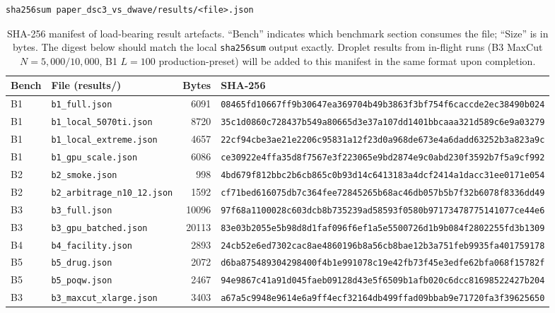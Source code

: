 \documentclass[11pt,a4paper]{article}
\begin{document}
\begin{verbatim}
sha256sum paper_dsc3_vs_dwave/results/<file>.json
\end{verbatim}

\begin{table}[h]
\centering
\caption{SHA-256 manifest of load-bearing result artefacts.
``Bench'' indicates which benchmark section consumes the file;
``Size'' is in bytes. The digest below should match the local
\texttt{sha256sum} output exactly. Droplet results from in-flight runs
(B3 MaxCut $N\!=\!5{,}000/10{,}000$, B1 $L\!=\!100$ production-preset)
will be added to this manifest in the same format upon completion.}
\label{tab:data_manifest}
\scriptsize
\setlength{\tabcolsep}{4pt}
\begin{tabular}{@{}l l r p{8.0cm}@{}}
\toprule
Bench & File (results/) & Bytes & SHA-256 \\
\midrule
B1 & \texttt{b1\_full.json}              & 6091  & \texttt{08465fd10667ff9b30647ea369704b49b3863f3bf754f6caccde2ec38490b024} \\
B1 & \texttt{b1\_local\_5070ti.json}     & 8720  & \texttt{35c1d0860c728437b549a80665d3e37a107dd1401bbcaaa321d589c6e9a03279} \\
B1 & \texttt{b1\_local\_extreme.json}    & 4657  & \texttt{22cf94cbe3ae21e2206c95831a12f23d0a968de673e4a6dadd63252b3a823a9c} \\
B1 & \texttt{b1\_gpu\_scale.json}        & 6086  & \texttt{ce30922e4ffa35d8f7567e3f223065e9bd2874e9c0abd230f3592b7f5a9cf992} \\
B2 & \texttt{b2\_smoke.json}             & 998   & \texttt{4bd679f812bbc2b6cb865c0b93d14c6413183a4dcf2414a1dacc31ee0171e054} \\
B2 & \texttt{b2\_arbitrage\_n10\_12.json}& 1592  & \texttt{cf71bed616075db7c364fee72845265b68ac46db057b5b7f32b6078f8336dd49} \\
B3 & \texttt{b3\_full.json}              & 10096 & \texttt{97f68a1100028c603dcb8b735239ad58593f0580b97173478775141077ce44e6} \\
B3 & \texttt{b3\_gpu\_batched.json}      & 20113 & \texttt{83e03b2055e5b98d8d1faf096f6ef1a5e5500726d1b9b084f2802255fd3b1309} \\
B4 & \texttt{b4\_facility.json}          & 2893  & \texttt{24cb52e6ed7302cac8ae4860196b8a56cb8bae12b3a751feb9935fa401759178} \\
B5 & \texttt{b5\_drug.json}              & 2072  & \texttt{d6ba875489304298400f4b1e991078c19e42fb73f45e3edfe62bfa068f15782f} \\
B5 & \texttt{b5\_poqw.json}              & 2467  & \texttt{94e9867c41a91d045faeb09128d43e5f6509b1afb020c6dcc81698522427b204} \\
B3 & \texttt{b3\_maxcut\_xlarge.json}    & 3403  & \texttt{a67a5c9948e9614e6a9ff4ecf32164db499ffad09bbab9e71720fa3f39625650} \\
\bottomrule
\end{tabular}
\end{table}
\end{document}
